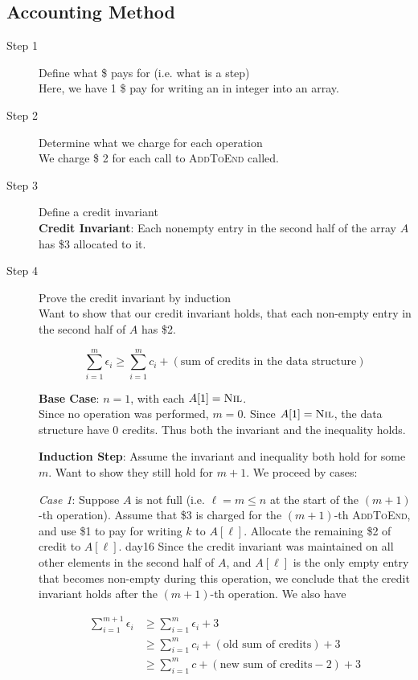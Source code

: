 \subsection*{Accounting Method}
\begin{description}
    \item[Step 1] Define what \$ pays for (i.e. what is a step) \\
    Here, we have 1 \$ pay for writing an in integer into an array. 

    \item[Step 2] Determine what we charge for each operation \\
    We charge \$ 2 for each call to \textsc{AddToEnd} called.

    \item[Step 3] Define a credit invariant \\
    \textbf{Credit Invariant}: Each nonempty entry in the second half of the array $A$ has \$3 allocated to it.
    
    \item[Step 4] Prove the credit invariant by induction \\
    Want to show that our credit invariant holds, that each non-empty entry in the second half of $A$ has \$2.

    \[
    \sum_{i=1}^{m} \epsilon_i \geq \sum_{i=1}^{m} c_i + (\text{sum of credits in the data structure})
    \]

    \textbf{Base Case}: $n = 1$, with each $A[1] = \textsc{Nil}$. \\
    Since no operation was performed, $m = 0$. Since $A[1] = \textsc{Nil}$, the data structure have 0 credits. Thus both the invariant and the inequality holds.

    \textbf{Induction Step}: Assume the invariant and inequality both hold for some $m$. Want to show they still hold for $m+1$. We proceed by cases:

    \textit{Case 1}: Suppose $A$ is not full (i.e. $\ell = m \leq n$ at the start of the $(m+1)$-th operation). Assume that \$3 is charged for the $(m+1)$-th \textsc{AddToEnd}, and use \$1 to pay for writing $k$ to $A[\ell]$. Allocate the remaining \$2 of credit to $A[\ell]$.
day16
    Since the credit invariant was maintained on all other elements in the second half of $A$, and $A[\ell]$ is the only empty entry that becomes non-empty during this operation, we conclude that the credit invariant holds after the $(m+1)$-th operation. We also have

    \begin{align*}
        \sum_{i=1}^{m+1}  \epsilon_i &\geq \sum_{i=1}^{m} \epsilon_i  + 3 \\
        &\geq \sum_{i=1}^{m} c_i + (\text{old sum of credits}) + 3 \\
        &\geq \sum_{i=1}^{m} c + (\text{new sum of credits} - 2) + 3
    \end{align*}


\end{description}
